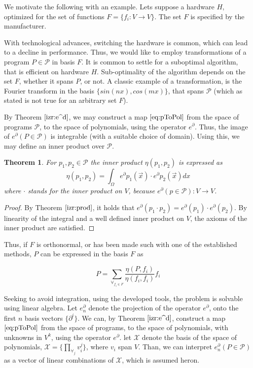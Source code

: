 \documentclass{article}
\newcommand{\X}{\mathcal{X}}
\newcommand{\dP}{\mathcal{P}}
\newcommand{\D}{\partial}
\newtheorem{izrek}{Theorem}[section]
\begin{document}
   We motivate the following with an example. Lets suppose a hardware $H$, optimized for the set of functions $F=\{f_i:V\to V\}$. The set $F$ is specified by the manufacturer.
   
   With technological advances, switching the hardware is common, which can lead to a decline in performance. Thus, we would like to employ transformations of a program $P\in\dP$ in basis $F$. It is common to settle for a suboptimal algorithm, that is efficient on hardware $H$. Sub-optimality of the algorithm depends on the set $F$, whether it spans $P$, or not. A classic example of a transformation, is the Fourier transform in the basis $\{sin(nx), cos(mx)\}$, that spans $\dP$ (which as stated is not true for an arbitrary set $F$).
   
   By Theorem $\ref{izr:e^d}$, we may construct a map $\eqref{eq:pToPol}$ from the space of programs $\dP$, to the space of polynomials, using the operator $e^\D$. Thus, the image of $e^\D(P\in\dP)$ is integrable (with a suitable choice of domain). Using this, we may define an inner product over $\dP$.
   
  \begin{izrek}
  For $p_1,p_2\in\dP$ the inner product $\eta(p_1,p_2)$ is expressed as
  \begin{equation}
  	\eta(p_1,p_2)=\int_{\Omega}e^\D p_1(\vec{x})\cdot e^\D p_2(\vec{x})dx
  \end{equation}
  where $\cdot$ stands for the inner product on $V$, because $e^\D(p\in\dP):V\to V$.
  \end{izrek}
  
  \begin{proof}
  By Theorem $\ref{izr:prod}$, it holds that $e^\D(p_1\cdot p_2)=e^\D(p_1)\cdot e^\D(p_2)$. By linearity of the integral and a well defined inner product on $V$, the axioms of the inner product are satisfied.
  \end{proof}
  
  Thus, if $F$ is orthonormal, or has been made such with one of the established methods, $P$ can be expressed in the basis $F$ as
  
  \begin{equation}
 	P=\sum\limits_{\forall_{f_i\in F}}\frac{\eta(P,f_i)}{\eta(f_i,f_i)}f_i
  \end{equation}
  
  Seeking to avoid integration, using the developed tools, the problem is solvable using linear algebra. Let $e^\D_n$ denote the projection of the operator $e^\D$, onto the first $n$ basis vectors $\{\D^i\}$. We can, by Theorem $\ref{izr:e^d}$, construct a map $\eqref{eq:pToPol}$ from the space of programs, to the space of polynomials, with unknowns in $V^k$, using the operator $e^\D$. let $\X$ denote the basis of the space of polynomials, $\X=\{\prod\limits_{\forall_j} v_i^j\}$, where $v_i$ span $V$. Than, we can interpret $e^\D_n(P\in\dP)$ as a vector of linear combinations of $\X$, which is assumed heron.
  
\end{document}
